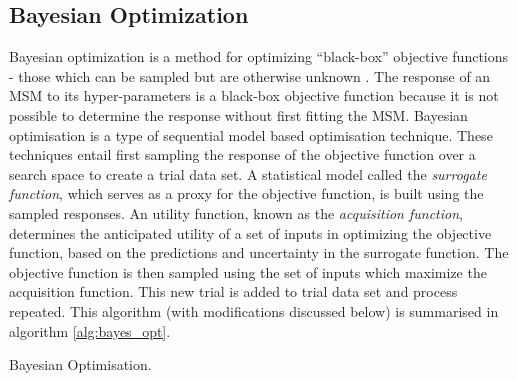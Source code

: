 \subsection{Bayesian Optimization}\label{subsec:bayes_opt}
Bayesian optimization is a method for optimizing ``black-box'' objective functions - those which can be sampled but are otherwise unknown \cite{shahriariTakingHumanOut2016}. The response of an MSM to its hyper-parameters is a black-box objective function because it is not possible to determine the response without first fitting the MSM. Bayesian optimisation is a type of sequential model based \cite{hutterSequentialModelbasedOptimization2011} optimisation technique. These techniques entail first sampling the response of the objective function over a search space to create a trial data set. A statistical model called the \emph{surrogate function}, which serves as a proxy for the objective function, is built using the sampled responses. An utility function, known as the \emph{acquisition function}, determines the anticipated utility of a set of inputs in optimizing the objective function, based on the predictions and uncertainty in the surrogate function.  The objective function is then sampled using the set of inputs which maximize the acquisition function. This new trial is added to trial data set and process repeated. This algorithm (with modifications discussed below) is summarised in algorithm \ref{alg:bayes_opt}. 

\begin{algorithm}\label{alg:bayes_opt}
\BlankLine
{}
\caption{Bayesian Optimisation.}
\end{algorithm}

